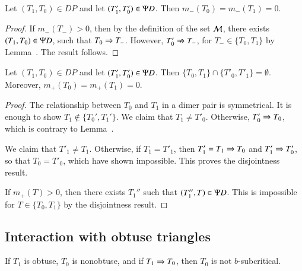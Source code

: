\begin{corollary}  
  Let $(T_1,T_0)\in DP$ and let $(T'_1,T'_0)\in \Psi D$.  Then
  $m_-(T_0)=m_-(T_1)=0$.
\end{corollary}

\begin{proof}  
  If $m_-(T_-)>0$, then by the definition of the set $\mathcal M$, there
  exists $(T_1,T_0)\in \Psi D$, such that $T_0\Rightarrow T_-$.  However,
  $T'_0\nRightarrow T_-$, for $T_-\in\{T_0,T_1\}$ by
  Lemma~.  The result follows.
\end{proof}

\begin{lemma}  
  Let $(T_1,T_0)\in DP$ and let $(T'_1,T'_0)\in\Psi D$.  Then
  $\{T_0,T_1\}\cap \{T'_0,T'_1\} = \emptyset$.  Moreover,
  $m_+(T_0) = m_+(T_1)=0$.
\end{lemma}

\begin{proof}
  The relationship between $T_0$ and $T_1$ in a dimer pair is
  symmetrical.  It is enough to show $T_1\not\in\{T_0',T_1'\}$.  We
  claim that $T_1\ne T'_0$.  Otherwise, $T'_0\Rightarrow T_0$, which is
  contrary to Lemma~.

  We claim that $T'_1\ne T_1$.  Otherwise, if $T_1=T'_1$, then
  $T'_1=T_1\Rightarrow T_0$ and $T'_1\Rightarrow T'_0$, so that $T_0 = T'_0$, which
  have shown impossible.  This proves the disjointness result.


  If $m_+(T) >0$, then there exists $T_1''$ such that $(T_1'',T)\in
  \Psi D$.  This is impossible for $T\in\{T_0,T_1\}$ by the disjointness
  result.
\end{proof}


\subsection{Interaction with obtuse triangles}

\begin{lemma}
  If $T_1$ is obtuse, $T_0$ is nonobtuse, and if $T_1 \Rightarrow T_0$, then
  $T_0$ is not $b$-subcritical.
\end{lemma}


